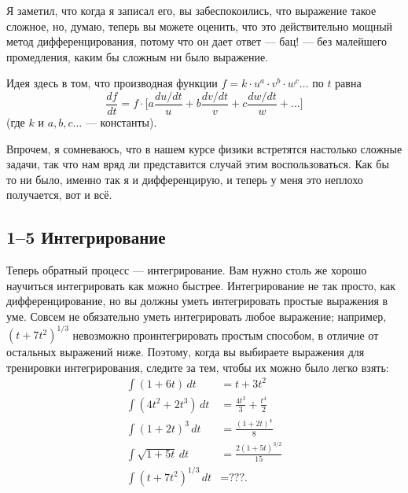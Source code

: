 \documentclass[11pt,oneside]{article}
\providecommand{\ddt}[2]{\frac{d#1}{d#2}}
\begin{document}
Я заметил, что когда я записал его, вы забеспокоились, что выражение такое сложное, но, думаю, теперь вы можете оценить, что это действительно мощный метод дифференцирования, потому что он дает ответ --- бац! --- без малейшего промедления, каким бы сложным ни было выражение.\par

Идея здесь в том, что производная функции \(f = k\cdot u^a\cdot v^b\cdot w^c\dots\) по \(t\) равна 
\begin{equation*} \tag{1.8}
\label{Eq:TIPS:1:8} \ddt{f}{t} = f\cdot\Bigg[a\frac{du/dt}{u}+b\frac{dv/dt}{v}+c\frac{dw/dt}{w}+\dots\Bigg] \end{equation*}
 (где \(k\) и \(a, b, c\dots\) --- константы).\par

Впрочем, я сомневаюсь, что в нашем курсе физики встретятся настолько сложные задачи, так что нам вряд ли представится случай этим воспользоваться. Как бы то ни было, именно так я и дифференцирую, и теперь у меня это неплохо получается, вот и всё.\par

\subsection*{1--5 Интегрирование}

Теперь обратный процесс --- интегрирование. Вам нужно столь же хорошо научиться интегрировать как можно быстрее. Интегрирование не так просто, как дифференцирование, но вы должны уметь интегрировать простые выражения в уме. Совсем не обязательно уметь интегрировать любое выражение; например, \((t+7t^2)^{1/3}\) невозможно проинтегрировать простым способом, в отличие от остальных выражений ниже. Поэтому, когда вы выбираете выражения для тренировки интегрирования, следите за тем, чтобы их можно было легко взять: 
\begin{equation*} \begin{aligned} \int (1+6t)\,dt &= t + 3t^2\\[.5ex] \int (4t^2 + 2t^3)\,dt &=\frac{4t^3}3+\frac{t^4}2\\[.5ex] \int (1+2t)^3\,dt &= \frac{(1+2t)^4}8\\[.5ex] \int \sqrt{1+5t}\,dt &= \frac{2(1+5t)^{3/2}}{15}\\[.5ex] \int (t+7t^2)^{1/3}\,dt &= \text{???.} \end{aligned} \tag{1.9}
\label{Eq:TIPS:1:9} \end{equation*}
\par
\end{document}

